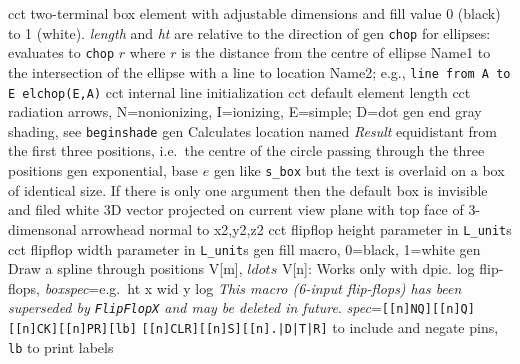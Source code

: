   {cct}
  { two-terminal box element with adjustable dimensions and fill
   value 0 (black) to 1 (white). {\sl length} and {\sl ht} are relative
   to the direction of \linespec{}}
  {gen}
  {{\tt chop} for ellipses: evaluates to {\tt chop} $r$ where $r$ is
    the distance from the centre of ellipse Name1 to the intersection of
    the ellipse with a line to location Name2;
    e.g., {\tt line from A to E elchop(E,A)}}
  {cct}
  {internal line initialization}
  {cct}
  {default element length}
  {cct}
  {radiation arrows, N=nonionizing, I=ionizing, E=simple;
     D=dot}
  {gen}
  {end gray shading, see {\tt beginshade}}
  {gen}
  {Calculates location named {\sl Result} equidistant from the first three
   positions, i.e.\ the centre of the circle passing through the three
   positions}
  {gen}
  {exponential, base $e$}
  {gen}
  {like {\tt s\_box} but the text is overlaid on a box of identical size.
   If there is only one argument then the default box
   is invisible and filed white
    }
  {3D}
  {vector projected on current view plane with top face
   of 3-dimensonal arrowhead normal to x2,y2,z2 }
  {cct}
  {flipflop height parameter in {\tt L\_unit}s}
  {cct}
  {flipflop width parameter in {\tt L\_unit}s}
  {gen}
  {fill macro, 0=black, 1=white}
  {gen}
  {Draw a spline through positions V[m], $ldots$ V[n]: Works only with dpic.}
  {log}
  {flip-flops,
  {\sl boxspec}=e.g.\ ht x wid y }
  {log}
  {{\em This macro (6-input flip-flops)
    has been superseded by {\tt FlipFlopX} and may be deleted
    in future}.
    {\sl spec}={\tt [[n]NQ][[n]Q][[n]CK][[n]PR][lb]}
    {\tt [[n]CLR][[n]S][[n].|D|T|R]} to include and negate pins,
    {\tt lb} to print labels }
